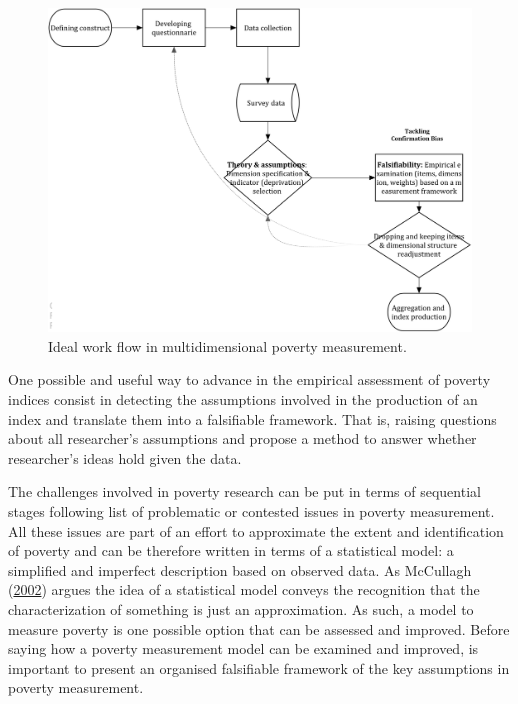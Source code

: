 \documentclass[]{book}
\begin{document}
\begin{figure}[H]

{\centering \includegraphics[width=3\textwidth]{ideal_workflow1} 

}

\caption{Ideal work flow in multidimensional poverty measurement.}\label{fig:idealwf}
\end{figure}

One possible and useful way to advance in the empirical assessment of poverty indices consist in detecting the assumptions involved in the production of an index and translate them into a falsifiable framework. That is, raising questions about all researcher's assumptions and propose a method to answer whether researcher's ideas hold given the data.

The challenges involved in poverty research can be put in terms of sequential stages following list of problematic or contested issues in poverty measurement. All these issues are part of an effort to approximate the extent and identification of poverty and can be therefore written in terms of a statistical model: a simplified and imperfect description based on observed data. As McCullagh (\protect\hyperlink{ref-McCullagh2002}{2002}) argues the idea of a statistical model conveys the recognition that the characterization of something is just an approximation. As such, a model to measure poverty is one possible option that can be assessed and improved. Before saying how a poverty measurement model can be examined and improved, is important to present an organised falsifiable framework of the key assumptions in poverty measurement.
\end{document}
